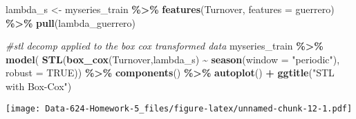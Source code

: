 \documentclass[
]{article}
\newenvironment{Shaded}{\begin{snugshade}}{\end{snugshade}}
\newcommand{\AttributeTok}[1]{\textcolor[rgb]{0.13,0.29,0.53}{#1}}
\newcommand{\CommentTok}[1]{\textcolor[rgb]{0.56,0.35,0.01}{\textit{#1}}}
\newcommand{\ConstantTok}[1]{\textcolor[rgb]{0.56,0.35,0.01}{#1}}
\newcommand{\FunctionTok}[1]{\textcolor[rgb]{0.13,0.29,0.53}{\textbf{#1}}}
\newcommand{\NormalTok}[1]{#1}
\newcommand{\OtherTok}[1]{\textcolor[rgb]{0.56,0.35,0.01}{#1}}
\newcommand{\SpecialCharTok}[1]{\textcolor[rgb]{0.81,0.36,0.00}{\textbf{#1}}}
\newcommand{\StringTok}[1]{\textcolor[rgb]{0.31,0.60,0.02}{#1}}
\begin{document}
\begin{Shaded}
\begin{Highlighting}[]
\NormalTok{lambda\_s }\OtherTok{\textless{}{-}}\NormalTok{ myseries\_train }\SpecialCharTok{\%\textgreater{}\%}
  \FunctionTok{features}\NormalTok{(Turnover, }\AttributeTok{features =}\NormalTok{ guerrero) }\SpecialCharTok{\%\textgreater{}\%}
  \FunctionTok{pull}\NormalTok{(lambda\_guerrero)}

\CommentTok{\#stl decomp applied to the box cox transformed data}
\NormalTok{myseries\_train }\SpecialCharTok{\%\textgreater{}\%}
  \FunctionTok{model}\NormalTok{(}
    \FunctionTok{STL}\NormalTok{(}\FunctionTok{box\_cox}\NormalTok{(Turnover,lambda\_s) }\SpecialCharTok{\textasciitilde{}} \FunctionTok{season}\NormalTok{(}\AttributeTok{window =} \StringTok{"periodic"}\NormalTok{), }\AttributeTok{robust =} \ConstantTok{TRUE}\NormalTok{)) }\SpecialCharTok{\%\textgreater{}\%}
  \FunctionTok{components}\NormalTok{() }\SpecialCharTok{\%\textgreater{}\%}
  \FunctionTok{autoplot}\NormalTok{() }\SpecialCharTok{+}
  \FunctionTok{ggtitle}\NormalTok{(}\StringTok{"STL with Box{-}Cox"}\NormalTok{)}
\end{Highlighting}
\end{Shaded}

\texttt{[image: Data-624-Homework-5\_files/figure-latex/unnamed-chunk-12-1.pdf]}
\end{document}
